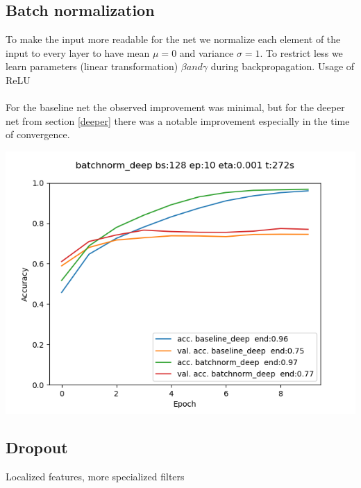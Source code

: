 \documentclass{article}
\newenvironment{Figure}
{\par\medskip\noindent\minipage{\linewidth}}
{\endminipage\par\medskip}
\begin{document}
\begin{multicols}{2}
\subsection{Batch normalization}
To make the input more readable for the net we normalize each element of the input to every layer to have mean $\mu=0$ and variance $\sigma=1$. To restrict less we learn parameters (linear transformation) $\beta and \gamma$ during backpropagation. Usage of ReLU\\
\\
For the baseline net the observed improvement was minimal, but for the deeper net from section \ref{deeper} there was a notable improvement especially in the time of convergence.

\begin{Figure}
	\label{fig:batchnorm}
	\centering
	\includegraphics[width=\linewidth]{../img_1_5_regularization/batchnorm_deep}
\end{Figure}

\subsection{Dropout}
Localized features, more specialized filters


\end{multicols}
\end{document}
